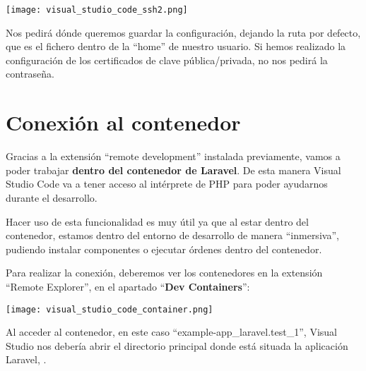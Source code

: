 \begin{center}
    \texttt{[image: visual\_studio\_code\_ssh2.png]}
\end{center}

Nos pedirá dónde queremos guardar la configuración, dejando la ruta por defecto, que es el fichero  dentro de la “home” de nuestro usuario. Si hemos realizado la configuración de los certificados de clave pública/privada, no nos pedirá la contraseña.


\section{Conexión al contenedor}

Gracias a la extensión “remote development” instalada previamente, vamos a poder trabajar \textbf{dentro del contenedor de Laravel}. De esta manera Visual Studio Code va a tener acceso al intérprete de PHP para poder ayudarnos durante el desarrollo.

Hacer uso de esta funcionalidad es muy útil ya que al estar dentro del contenedor, estamos dentro del entorno de desarrollo de manera “inmersiva”, pudiendo instalar componentes o ejecutar órdenes dentro del contenedor.

Para realizar la conexión, deberemos ver los contenedores en la extensión “Remote Explorer”, en el apartado “\textbf{Dev Containers}”:

\begin{center}
    \texttt{[image: visual\_studio\_code\_container.png]}
\end{center}

Al acceder al contenedor, en este caso “example-app\_laravel.test\_1”, Visual Studio nos debería abrir el directorio principal donde está situada la aplicación Laravel, .